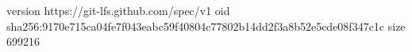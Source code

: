 version https://git-lfs.github.com/spec/v1
oid sha256:9170e715ca04fe7f043eabc59f40804c77802b14dd2f3a8b52e5cde08f347c1c
size 699216
